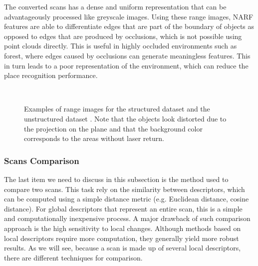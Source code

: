 The converted scans has a dense and uniform representation that can be advantageously processed like greyscale images. Using these range images, NARF features are able to differentiate edges that are part of the boundary of objects as opposed to edges that are produced by occlusions, which is not possible using point clouds directly. This is useful in highly occluded environments such as forest, where edges caused by occlusions can generate meaningless features. This in turn leads to a poor representation of the environment, which can reduce the place recognition performance.


\begin{figure}[H]
    \centering
    \\
    \caption{Examples of range images for the structured dataset \protect{} and the unstructured dataset \protect{}. Note that the objects look distorted due to the projection on the plane and that the background color corresponds to the areas without laser return.}
    \label{fig:chap_slam_range}
\end{figure}

\subsubsection{Scans Comparison}
\label{ssub:scans_comparison}

The last item we need to discuss in this subsection is the method used to compare two scans. This task rely on the similarity between descriptors, which can be computed using a simple distance metric (e.g. Euclidean distance, cosine distance). For global descriptors that represent an entire scan, this is a simple and computationally inexpensive process. A major drawback of such comparison approach is the high sensitivity to local changes. Although methods based on local descriptors require more computation, they generally yield more robust results. As we will see, because a scan is made up of several local descriptors, there are different techniques for comparison.

